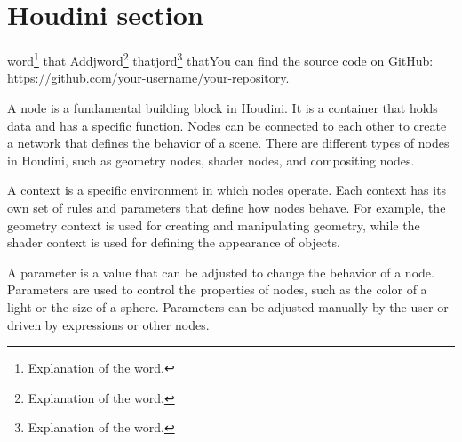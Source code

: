 



\section*{Houdini section}



word\footnote{Explanation of the word.} that Addjword\footnote{Explanation of the word.} thatjord\footnote{Explanation of the word.} thatYou can find the source code on GitHub: \url{https://github.com/your-username/your-repository}.
%
%
%





A node is a fundamental building block in Houdini. It is a container that holds data and has a specific function. Nodes can be connected to each other to create a network that defines the behavior of a scene. There are different types of nodes in Houdini, such as geometry nodes, shader nodes, and compositing nodes.

A context is a specific environment in which nodes operate. Each context has its own set of rules and parameters that define how nodes behave. For example, the geometry context is used for creating and manipulating geometry, while the shader context is used for defining the appearance of objects.

\lipsum[1-20]
A parameter is a value that can be adjusted to change the behavior of a node. Parameters are used to control the properties of nodes, such as the color of a light or the size of a sphere. Parameters can be adjusted manually by the user or driven by expressions or other nodes.

